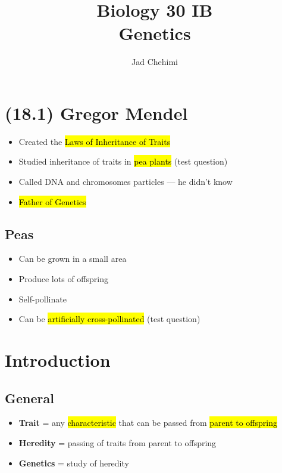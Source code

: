 \documentclass[a4paper,12pt]{article}
\title{Biology 30 IB \\ Genetics}
\author{Jad Chehimi}
\begin{document}
\maketitle

\tableofcontents

\pagebreak

\section{(18.1) Gregor Mendel}
\begin{itemize}
    \item{Created the \hl{Laws of Inheritance of Traits}}
    \item{Studied inheritance of traits in \hl{pea plants} (test question)}
    \item{Called DNA and chromosomes particles --- he didn't know}
    \item{\hl{Father of Genetics}}
\end{itemize}

\subsection{Peas}
\begin{itemize}
    \item{Can be grown in a small area}
    \item{Produce lots of offspring}
    \item{Self-pollinate}
    \item{Can be \hl{artificially cross-pollinated} (test question)}
\end{itemize}

\section{Introduction}
\subsection{General}
\begin{itemize}
    \item{\textbf{Trait} = any \hl{characteristic} that can be passed from \hl{parent to offspring}}
    \item{\textbf{Heredity} = passing of traits from parent to offspring}
    \item{\textbf{Genetics} = study of heredity}
\end{itemize}
\end{document}
